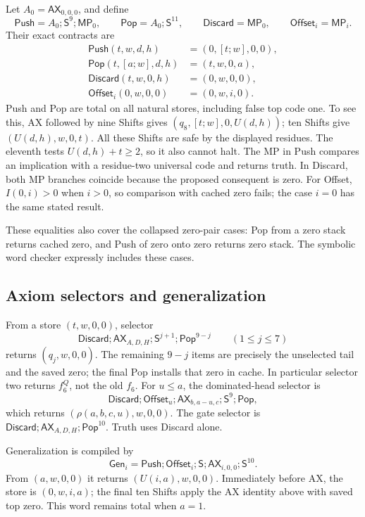 \documentclass[10pt,letterpaper]{article}
\newcommand{\AX}{\mathsf{AX}}
\newcommand{\MP}{\mathsf{MP}}
\newcommand{\Sh}{\mathsf S}
\newcommand{\Pop}{\mathsf{Pop}}
\newcommand{\Push}{\mathsf{Push}}
\newcommand{\Discard}{\mathsf{Discard}}
\newcommand{\Offset}{\mathsf{Offset}}
\newcommand{\Gen}{\mathsf{Gen}}
\begin{document}
Let \(A_0=\AX_{0,0,0}\), and define
\[
 \Push=A_0;\Sh^9;\MP_0,\qquad
 \Pop=A_0;\Sh^{11},\qquad
 \Discard=\MP_0,\qquad \Offset_i=\MP_i.
\]
Their exact contracts are
\begin{align}
 \Push(t,w,d,h)&=(0,[t;w],0,0),\label{eq:push}\\
 \Pop(t,[a;w],d,h)&=(t,w,0,a),\label{eq:pop}\\
 \Discard(t,w,0,h)&=(0,w,0,0),\label{eq:discard}\\
 \Offset_i(0,w,0,0)&=(0,w,i,0).\label{eq:offset}
\end{align}
Push and Pop are total on all natural stores, including false top code one.
To see this, AX followed by nine Shifts gives
\((q_8,[t;w],0,U(d,h))\); ten Shifts give \((U(d,h),w,0,t)\).
All these Shifts are safe by the displayed residues. The eleventh tests
\(U(d,h)+t\ge2\), so it also cannot halt. The MP in Push compares an
implication with a residue-two universal code and returns truth. In
Discard, both MP branches coincide because the proposed consequent is zero.
For Offset, \(I(0,i)>0\) when \(i>0\), so comparison with cached zero
fails; the case \(i=0\) has the same stated result.

These equalities also cover the collapsed zero-pair cases: Pop from a zero
stack returns cached zero, and Push of zero onto zero returns zero stack.
The symbolic word checker expressly includes these cases.

\subsection{Axiom selectors and generalization}

From a store \((t,w,0,0)\), selector
\[
 \Discard;\AX_{A,D,H};\Sh^{j+1};\Pop^{9-j}
 \qquad(1\le j\le7)
\]
returns \((q_j,w,0,0)\). The remaining \(9-j\) items are precisely the
unselected tail and the saved zero; the final Pop installs that zero in
cache. In particular selector two returns \(f_6^Q\), not the old \(f_6\).
For \(u\le a\), the dominated-head selector is
\[
 \Discard;\Offset_u;\AX_{b,a-u,c};\Sh^9;\Pop,
\]
which returns \((\rho(a,b,c,u),w,0,0)\). The gate selector is
\(\Discard;\AX_{A,D,H};\Pop^{10}\). Truth uses Discard alone.

Generalization is compiled by
\[
 \Gen_i=\Push;\Offset_i;\Sh;\AX_{i,0,0};\Sh^{10}.
\]
From \((a,w,0,0)\) it returns \((U(i,a),w,0,0)\). Immediately before AX,
the store is \((0,w,i,a)\); the final ten Shifts apply the AX identity
above with saved top zero. This word remains total when \(a=1\).
\end{document}
